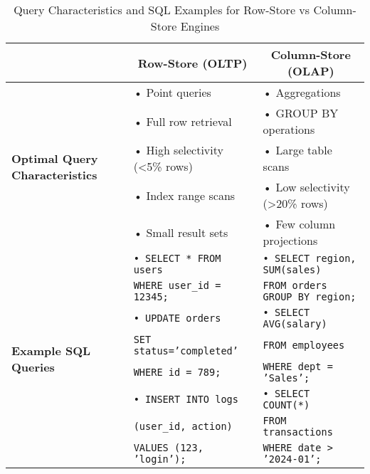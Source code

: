 \documentclass[sigconf, nonacm]{acmart}
\begin{document}
\begin{table}[t]
\centering
\caption{Query Characteristics and SQL Examples for Row-Store vs Column-Store Engines}
\label{tab:engine-comparison}
\footnotesize
\setlength{\tabcolsep}{5pt}
\renewcommand{\arraystretch}{1.2}
\begin{tabular}{@{}p{}p{}p{}@{}}
\toprule
& \multicolumn{1}{c}{\textbf{Row-Store (OLTP)}} 
& \multicolumn{1}{c}{\textbf{Column-Store (OLAP)}} \\
\midrule
\multirow{5}{=}{\centering\textbf{Optimal Query Characteristics}}
& • Point queries & • Aggregations \\
& • Full row retrieval & • GROUP BY operations \\
& • High selectivity (<5\% rows) & • Large table scans \\
& • Index range scans & • Low selectivity (>20\% rows) \\
& • Small result sets & • Few column projections \\
\midrule
\multirow{9}{=}{\centering\textbf{Example SQL Queries}}
& \texttt{\tiny • SELECT * FROM users} & \texttt{\tiny • SELECT region, SUM(sales)} \\
& \texttt{\tiny WHERE user\_id = 12345;} & \texttt{\tiny FROM orders GROUP BY region;} \\[-2pt]
& \texttt{\tiny • UPDATE orders} & \texttt{\tiny • SELECT AVG(salary)} \\
& \texttt{\tiny SET status='completed'} & \texttt{\tiny FROM employees} \\
& \texttt{\tiny WHERE id = 789;} & \texttt{\tiny WHERE dept = 'Sales';} \\[-2pt]
& \texttt{\tiny • INSERT INTO logs} & \texttt{\tiny • SELECT COUNT(*)} \\
& \texttt{\tiny (user\_id, action)} & \texttt{\tiny FROM transactions} \\
& \texttt{\tiny VALUES (123, 'login');} & \texttt{\tiny WHERE date > '2024-01';} \\
\bottomrule
\end{tabular}
\vspace{-2em}
\end{table}

\end{document}
